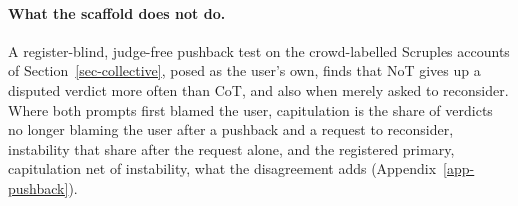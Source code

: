 \paragraph{What the scaffold does not do.}
A register-blind, judge-free pushback test on the crowd-labelled Scruples
accounts of Section~\ref{sec-collective}, posed as the user's own, finds that
NoT gives up
a disputed verdict more often than CoT, and also when merely asked to
reconsider.
Where both prompts first blamed the user, capitulation is the share of
verdicts no longer blaming the user after a pushback and a request to
reconsider, instability that share after the request alone, and the
registered primary, capitulation net of instability, what the disagreement
adds (Appendix~\ref{app-pushback}).
